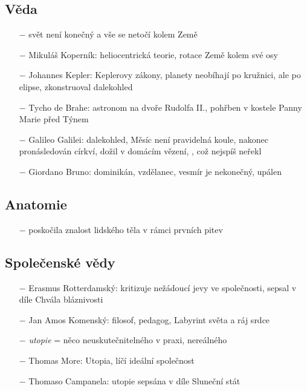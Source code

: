 \documentclass{article}
\begin{document}
\subsection*{Věda}
\begin{itemize}
    \vspace{-0.5em}
    \setlength\itemsep{0.15em}
    \item[$-$] svět není konečný a vše se netočí kolem Země
    \item[$-$] Mikuláš Koperník: heliocentrická teorie, rotace Země kolem své osy
    \item[$-$] Johannes Kepler: Keplerovy zákony, planety neobíhají po kružnici, ale po elipse, zkonstruoval dalekohled
    \item[$-$] Tycho de Brahe: astronom na dvoře Rudolfa II., pohřben v kostele Panny Marie před Týnem
    \item[$-$] Galileo Galilei: dalekohled, Měsíc není pravidelná koule, nakonec pronásledován církví, dožil v domácím vězení, , což nejspíš neřekl
    \item[$-$] Giordano Bruno: dominikán, vzdělanec, vesmír je nekonečný, upálen
\end{itemize}

\subsection*{Anatomie}
\begin{itemize}
    \vspace{-0.5em}
    \setlength\itemsep{0.15em}
    \item[$-$] poskočila znalost lidského těla v rámci prvních pitev
\end{itemize}

\subsection*{Společenské vědy}
\begin{itemize}
    \vspace{-0.5em}
    \setlength\itemsep{0.15em}
    \item[$-$] Erasmus Rotterdamský: kritizuje nežádoucí jevy ve společnosti, sepsal v díle Chvála bláznivosti
    \item[$-$] Jan Amos Komenský: filosof, pedagog, Labyrint světa a ráj srdce
    \item[$-$] \textit{utopie} = něco neuskutečnitelného v praxi, nereálného
    \item[$-$] Thomas More: Utopia, líčí ideální společnost
    \item[$-$] Thomaso Campanela: utopie sepsána v díle Sluneční stát
\end{itemize}
\end{document}
